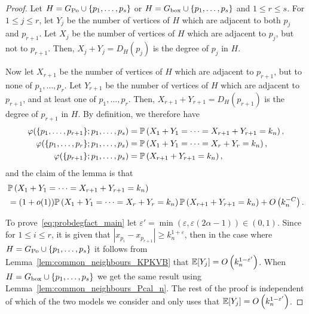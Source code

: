 \begin{proof}
Let $H=G_{{\mathrm{Po}}} \cup\{p_1,\dots,p_s\}$ or $H=G_{\mathrm{box}} \cup \{p_1,\dots,p_s\}$ and $1\leq r\leq s$. For $1\leq j \leq r$, let $Y_j$ be the number of vertices of $H$ which are adjacent to both $p_j$ and $p_{r+1}$. Let $X_j$ be the number of vertices of $H$ which are adjacent to $p_j$, but not to $p_{r+1}$. Then, $X_j+Y_j= D_{H}(p_j)$ is the degree of $p_j$ in $H$. 

Now let $X_{r+1}$ be the number of vertices of $H$ which are adjacent to $p_{r+1}$, but to none of $p_1,\dots,p_r$. Let $Y_{r+1}$ be the number of vertices of $H$ which are adjacent to $p_{r+1}$, and at least one of $p_1,\dots,p_r$. Then, $X_{r+1}+Y_{r+1}=D_H(p_{r+1})$ is the degree of $p_{r+1}$ in $H$. By definition, we therefore have
\begin{align*}
\varphi(\{p_1,\dots,p_{r+1}\};p_1,\dots,p_s)&=\mathbb{P}\left(X_1+Y_1=\dots=X_{r+1}+Y_{r+1}=k_n\right), \\
\varphi(\{p_1,\dots,p_r\};p_1,\dots,p_s)&=\mathbb{P}\left(X_1+Y_1=\dots=X_r+Y_r=k_n\right), \\
\varphi(\{p_{r+1}\};p_1,\dots,p_s)&=\mathbb{P}\left(X_{r+1}+Y_{r+1}=k_n\right),
\end{align*}
and the claim of the lemma is that
\begin{equation}\label{eq:probdegfact_main}
	\begin{aligned}
		&\mathbb{P}\left(X_1+Y_1=\dots=X_{r+1}+Y_{r+1}=k_n\right) \\
		&= (1+o(1))\mathbb{P}\left(X_1+Y_1=\dots=X_r+Y_r=k_n\right)\mathbb{P}\left(X_{r+1}+Y_{r+1}=k_n\right)+O\left(k_n^{-C}\right).
	\end{aligned}
\end{equation}

To prove~\eqref{eq:probdegfact_main} let $\varepsilon'=\min(\varepsilon,\varepsilon(2\alpha-1))\in (0,1)$. Since for $1\leq i \leq r$, it is given that $|x_{p_i}-x_{p_{r+1}}|\geq k_n^{1+\varepsilon}$, then in the case where $H = G_{{\mathrm{Po}}} \cup\{p_1,\dots,p_s\}$ it follows from Lemma~\ref{lem:common_neighbours_KPKVB} that $\mathbb{E}[Y_j] = O\left(k_n^{1-\varepsilon'}\right)$. When $H=G_{\mathrm{box}} \cup \{p_1,\dots,p_s\}$ we get the same result using Lemma~\ref{lem:common_neighbours_Pcal_n}. The rest of the proof is independent of which of the two models we consider and only uses that $\mathbb{E}[Y_j] = O\left(k_n^{1-\varepsilon'}\right)$.


\end{proof}
